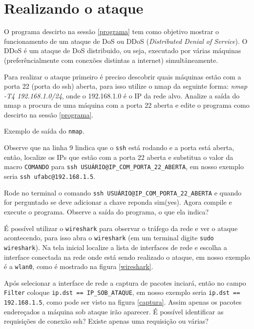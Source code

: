 \documentclass[12pt]{abnt}
\begin{document}
\section{Realizando o ataque}

O programa descirto na sessão \ref{programa} tem como objetivo mostrar o funcionamento de um ataque de
DoS ou DDoS (\textit{Distributed Denial of Service}). O DDoS é um ataque de DoS distribuido, ou seja,
executado por várias máquinas (preferêncialmente com conexões distintas a internet) simultâneamente.

Para realizar o ataque primeiro é preciso descobrir quais máquinas estão com a porta 22 (porta do ssh)
aberta, para isso utilize o nmap da seguinte forma: \textit{nmap -T4 192.168.1.0/24}, onde o 192.168.1.0
é o IP da rede alvo. Analize a saída
do nmap a procura de uma máquina com a porta 22 aberta e edite o programa como descirto na sessão \ref{programa}.

\renewcommand{\baselinestretch}{0.5}  %
\begin{codigo}[!hbt]
   \tiny  %
   \caption{Exemplo de saída do \texttt{nmap}.}
   \label{nmap}
\end{codigo}

Observe que na linha 9 lindica que o \texttt{ssh} está rodando e a porta está aberta, então, localize os IPs que estão com a porta 22 
aberta e substitua o valor da macro \texttt{COMANDO} para \texttt{ssh USUÁRIO@IP\_COM\_PORTA\_22\_ABERTA}, em nosso exemplo seria
\texttt{ssh ufabc@192.168.1.5}. 

Rode no terminal o comando \texttt{ssh USUÁRIO@IP\_COM\_PORTA\_22\_ABERTA} e quando for perguntado se deve adicionar a chave reponda sim(yes).
Agora compile e execute o programa. Observe a saída do programa, o que ela indica?

É possível utilizar o \texttt{wireshark} para observar o tráfego da rede e ver o ataque acontecendo, para isso abra o \texttt{wireshark}
(em um terminal digite \texttt{sudo wireshark}). Na tela inicial localize a lista de interfaces de rede e escolha a interface conectada na
rede onde está sendo realizado o ataque, em nosso exemplo é a \texttt{wlan0}, como é mostrado na figura \ref{wireshark}.

Após selecionar a interface de rede a captura de pacotes inciará, então no campo \texttt{Filter} coloque \texttt{ip.dst == IP\_SOB\_ATAQUE},
em nosso exemplo seria \texttt{ip.dst == 192.168.1.5}, como pode ser visto na figura \ref{captura}. Assim apenas os pacotes endereçados
a máquina sob ataque irão aparecer. É possível identificar as requisições de conexão ssh? Existe apenas uma requisição ou várias?
\end{document}
